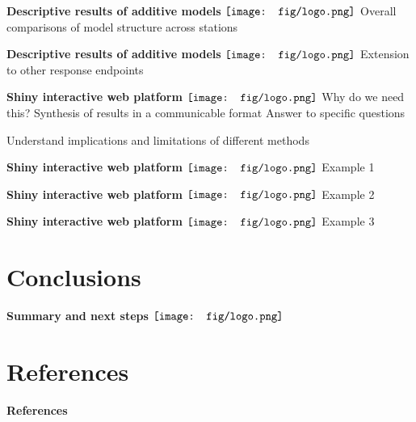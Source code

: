 \documentclass{beamer}
\begin{document}
\begin{frame}{\textbf{Descriptive results of additive models} \hspace{0pt plus 1 filll} $\vcenter{\hbox{\texttt{[image: fig/logo.png]}}}$}
Overall comparisons of model structure across stations
\end{frame}

\begin{frame}{\textbf{Descriptive results of additive models} \hspace{0pt plus 1 filll} $\vcenter{\hbox{\texttt{[image: fig/logo.png]}}}$}
Extension to other response endpoints
\end{frame}

\begin{frame}{\textbf{Shiny interactive web platform} \hspace{0pt plus 1 filll} $\vcenter{\hbox{\texttt{[image: fig/logo.png]}}}$}
Why do we need this?
Synthesis of results in a communicable format
Answer to specific questions

Understand implications and limitations of different methods
\end{frame}
\begin{frame}{\textbf{Shiny interactive web platform} \hspace{0pt plus 1 filll} $\vcenter{\hbox{\texttt{[image: fig/logo.png]}}}$}
Example 1
\end{frame}

\begin{frame}{\textbf{Shiny interactive web platform} \hspace{0pt plus 1 filll} $\vcenter{\hbox{\texttt{[image: fig/logo.png]}}}$}
Example 2
\end{frame}

\begin{frame}{\textbf{Shiny interactive web platform} \hspace{0pt plus 1 filll} $\vcenter{\hbox{\texttt{[image: fig/logo.png]}}}$}
Example 3
\end{frame}

\section{Conclusions}

\begin{frame}{\textbf{Summary and next steps} \hspace{0pt plus 1 filll} $\vcenter{\hbox{\texttt{[image: fig/logo.png]}}}$}

\end{frame}


\section{References}

\begin{frame}[t]{\textbf{References}}
\tiny
{}


\end{frame}
\end{document}
